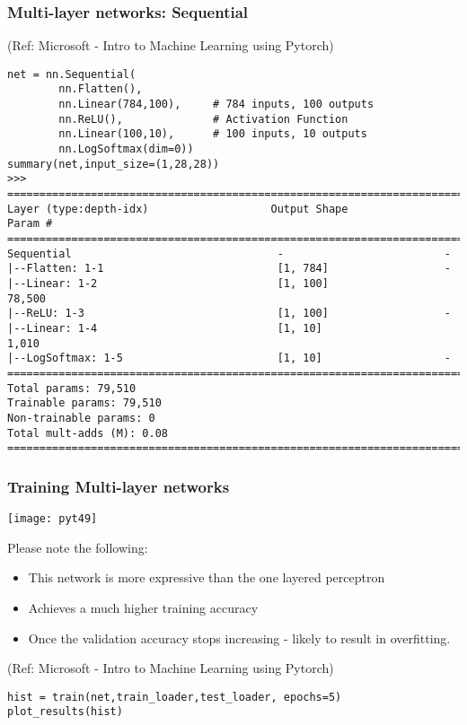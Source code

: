 \begin{frame}[fragile] \frametitle{Multi-layer networks: Sequential}

\tiny{(Ref: Microsoft - Intro to Machine Learning using Pytorch)}

\begin{lstlisting}
net = nn.Sequential(
        nn.Flatten(), 
        nn.Linear(784,100),     # 784 inputs, 100 outputs
        nn.ReLU(),              # Activation Function
        nn.Linear(100,10),      # 100 inputs, 10 outputs
        nn.LogSoftmax(dim=0))
summary(net,input_size=(1,28,28))
>>>
===========================================================================
Layer (type:depth-idx)                   Output Shape              Param #
===========================================================================
Sequential                                -                         -
|--Flatten: 1-1                           [1, 784]                  -
|--Linear: 1-2                            [1, 100]                  78,500
|--ReLU: 1-3                              [1, 100]                  -
|--Linear: 1-4                            [1, 10]                   1,010
|--LogSoftmax: 1-5                        [1, 10]                   -
===========================================================================
Total params: 79,510
Trainable params: 79,510
Non-trainable params: 0
Total mult-adds (M): 0.08
===========================================================================
\end{lstlisting}


\end{frame}


\begin{frame}[fragile] \frametitle{Training Multi-layer networks}

\begin{center}
\texttt{[image: pyt49]}
\end{center}

Please note the following:
\begin{itemize}
\item This network is more expressive than the one layered perceptron
\item Achieves a much higher training accuracy
\item Once the validation accuracy stops increasing - likely to result in overfitting.
\end{itemize}

\tiny{(Ref: Microsoft - Intro to Machine Learning using Pytorch)}


\begin{lstlisting}
hist = train(net,train_loader,test_loader, epochs=5)
plot_results(hist)
\end{lstlisting}
\end{frame}

